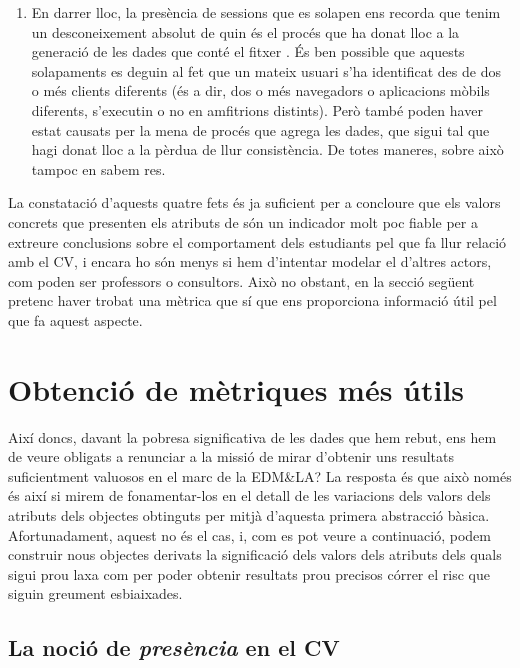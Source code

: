 \documentclass[
	a4paper,
	twoside,
	justified
]{tufte-book}
\begin{document}
\begin{enumerate}[(1)]
\item En darrer lloc, la presència de sessions que es solapen ens recorda que tenim un desconeixement absolut de quin és el procés que ha donat lloc a la generació de les dades que conté el fitxer . És ben possible que aquests solapaments es deguin al fet que un mateix usuari s'ha identificat des de dos o més clients diferents (és a dir, dos o més navegadors o aplicacions mòbils diferents, s'executin o no en amfitrions distints). Però també poden haver estat causats per la mena de procés que agrega les dades, que sigui tal que hagi donat lloc a la pèrdua de llur consistència. De totes maneres, sobre això tampoc en sabem res.        
      
\end{enumerate}

La constatació d'aquests quatre fets és ja suficient per a concloure que els valors concrets que presenten els atributs de  són un indicador molt poc fiable per a extreure conclusions sobre el comportament dels estudiants pel que fa llur relació amb el CV, i encara ho són menys si hem d'intentar modelar el d'altres actors, com poden ser professors o consultors. Això no obstant, en la secció següent pretenc haver trobat una mètrica que sí que ens proporciona informació útil pel que fa aquest aspecte.     
   
\section{Obtenció de mètriques més útils}
\label{sec:useful_metrics}

Així doncs, davant la pobresa significativa de les dades que hem rebut, ens hem de veure obligats a renunciar a la missió de mirar d'obtenir uns resultats suficientment valuosos en el marc de la EDM\&LA? La resposta és que això només és així si mirem de fonamentar-los en el detall de les variacions dels valors dels atributs dels objectes obtinguts per mitjà d'aquesta primera abstracció bàsica. Afortunadament, aquest no és el cas, i, com es pot veure a continuació, podem construir nous objectes derivats la significació dels valors dels atributs dels quals sigui prou laxa com per poder obtenir resultats prou precisos córrer el risc que siguin greument esbiaixades.       

\subsection{La noció de \emph{presència} en el CV}
\end{document}
